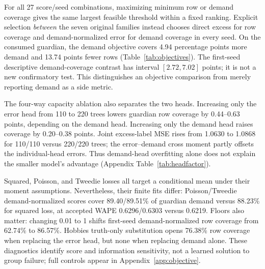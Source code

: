 For all 27 score/seed combinations, maximizing minimum row or demand coverage gives the same largest feasible threshold within a fixed ranking. Explicit selection \emph{between} the seven original families instead chooses direct excess for row coverage and demand-normalized error for demand coverage in every seed. On the consumed guardian, the demand objective covers 4.94 percentage points more demand and 13.74 points fewer rows (Table~\ref{tab:objectives}). The first-seed descriptive demand-coverage contrast has interval $[2.72,7.02]$ points; it is not a new confirmatory test. This distinguishes an objective comparison from merely reporting demand as a side metric.

The four-way capacity ablation also separates the two heads. Increasing only the error head from 110 to 220 trees lowers guardian row coverage by 0.44--0.63 points, depending on the demand head. Increasing only the demand head raises coverage by 0.20--0.38 points. Joint excess-label MSE rises from 1.0630 to 1.0868 for 110/110 versus 220/220 trees; the error--demand cross moment partly offsets the individual-head errors. Thus demand-head overfitting alone does not explain the smaller model's advantage (Appendix Table~\ref{tab:headfactor}).

Squared, Poisson, and Tweedie losses all target a conditional mean under their moment assumptions. Nevertheless, their finite fits differ: Poisson/Tweedie demand-normalized scores cover 89.40/89.51\% of guardian demand versus 88.23\% for squared loss, at accepted WAPE 0.6296/0.6303 versus 0.6219. Floors also matter: changing 0.01 to 1 shifts first-seed demand-normalized row coverage from 62.74\% to 86.57\%. Hobbies truth-only substitution opens 76.38\% row coverage when replacing the error head, but none when replacing demand alone. These diagnostics identify score and information sensitivity, not a learned solution to group failure; full controls appear in Appendix~\ref{app:objective}.
